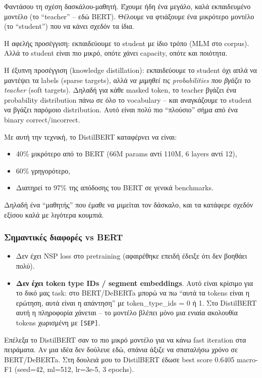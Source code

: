 \documentclass[12pt]{fphw}
\begin{document}
Φαντάσου τη σχέση δασκάλου-μαθητή. Έχουμε ήδη ένα μεγάλο, καλά εκπαιδευμένο μοντέλο (το ``teacher'' -- εδώ BERT). Θέλουμε να φτιάξουμε ένα μικρότερο μοντέλο (το ``student'') που να κάνει σχεδόν τα ίδια.

Η αφελής προσέγγιση: εκπαιδεύουμε το student με ίδιο τρόπο (MLM στο corpus). Αλλά το student είναι πιο μικρό, οπότε χάνει capacity, οπότε και ποιότητα.

Η έξυπνη προσέγγιση (knowledge distillation): εκπαιδεύουμε το student όχι απλά να μαντέψει τα labels (sparse targets), αλλά \emph{να μιμηθεί τις probabilities που βγάζει το teacher} (soft targets). Δηλαδή για κάθε masked token, το teacher βγάζει ένα probability distribution πάνω σε όλο το vocabulary -- και αναγκάζουμε το student να βγάζει παρόμοιο distribution. Αυτό είναι πολύ πιο ``πλούσιο'' σήμα από ένα binary correct/incorrect.

Με αυτή την τεχνική, το DistilBERT καταφέρνει να είναι:
\begin{itemize}
    \item 40\% μικρότερο από το BERT (66M params αντί 110M, 6 layers αντί 12),
    \item 60\% γρηγορότερο,
    \item Διατηρεί το 97\% της απόδοσης του BERT σε γενικά benchmarks.
\end{itemize}

Δηλαδή ένα ``μαθητής'' που έμαθε να μιμείται τον δάσκαλο, και τα κατάφερε σχεδόν εξίσου καλά με λιγότερα κουμπιά.

\subsubsection{Σημαντικές διαφορές vs BERT}

\begin{itemize}
    \item Δεν έχει NSP loss στο pretraining (αφαιρέθηκε επειδή έδειξε ότι δεν βοηθάει πολύ).
    \item \textbf{Δεν έχει token type IDs / segment embeddings}. Αυτό είναι κρίσιμο για το δικό μας task: στο BERT/DeBERTa μπορώ να πω ``αυτά τα tokens είναι η ερώτηση, αυτά είναι η απάντηση'' με token\_type\_ids = 0 ή 1. Στο DistilBERT αυτή η πληροφορία χάνεται -- το μοντέλο βλέπει μόνο μια ενιαία ακολουθία tokens χωρισμένη με \texttt{[SEP]}.
\end{itemize}

Επέλεξα το DistilBERT σαν το πιο μικρό μοντέλο για να κάνω fast iteration στα πειράματα. Αν μια ιδέα δεν δούλευε εδώ, σπάνια άξιζε να σπαταλήσω χρόνο σε BERT/DeBERTa. Στη δουλειά μου το DistilBERT έδωσε best score 0.6405 macro-F1 (seed=42, ml=512, lr=3e-5, 3 epochs).
\end{document}
